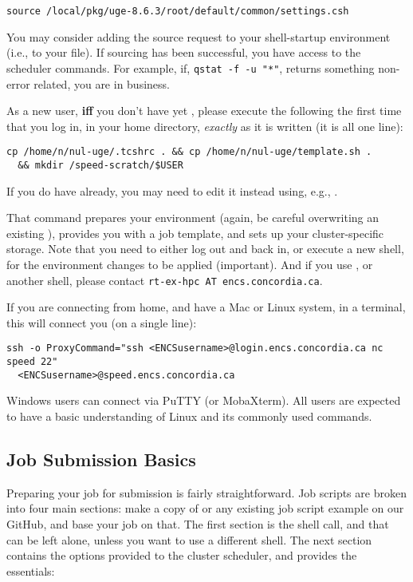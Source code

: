 \documentclass{easychair}
\begin{document}
\begin{verbatim}
source /local/pkg/uge-8.6.3/root/default/common/settings.csh 
\end{verbatim}

You may consider adding the source request to your shell-startup environment
(i.e., to your  file). If sourcing has been successful, you have 
access to the scheduler commands. For example, if, \texttt{qstat -f -u "*"}, 
returns something non-error related, you are in business. 

As a new user, \textbf{iff} you don't have yet ,
please execute the following the first time that you log
in, in your home directory, \emph{exactly} as it is written (it is all one
line):

\begin{verbatim}
cp /home/n/nul-uge/.tcshrc . && cp /home/n/nul-uge/template.sh .
  && mkdir /speed-scratch/$USER
\end{verbatim}

If you do have  already, you may need to edit it instead
using, e.g., .

That command prepares your environment (again, be careful overwriting an existing
), provides you with a job template, and sets up your
cluster-specific storage. Note that you need to either log out and back
in, or execute a new shell, for the environment changes to be applied
(important). And if you use , or another shell, please contact 
\texttt{rt-ex-hpc AT encs.concordia.ca}.

If you are connecting from home, and have a Mac or Linux system, in a
terminal, this will connect you (on a single line):

\begin{verbatim}
ssh -o ProxyCommand="ssh <ENCSusername>@login.encs.concordia.ca nc speed 22"
  <ENCSusername>@speed.encs.concordia.ca
\end{verbatim}

Windows users can connect via PuTTY (or MobaXterm). All users are expected
to have a basic understanding of Linux and its commonly used commands.

\subsection{Job Submission Basics}

Preparing your job for submission is fairly straightforward. Job scripts
are broken into four main sections: make a copy of 
or any existing job script example on our GitHub, and base
your job on that. The first section is the shell call, and that can be
left alone, unless you want to use a different shell. The next section
contains the options provided to the cluster scheduler, and 
provides the essentials:
\end{document}
